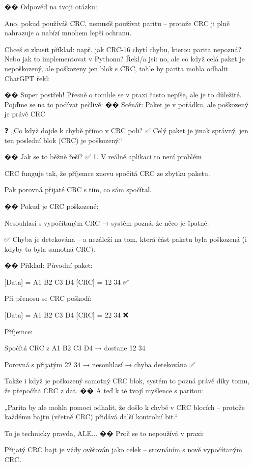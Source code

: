 �� Odpověď na tvoji otázku:

    Ano, pokud používáš CRC, nemusíš používat paritu – protože CRC ji plně nahrazuje a nabízí mnohem lepší ochranu.

Chceš si zkusit příklad: např. jak CRC-16 chytí chybu, kterou parita nepozná? Nebo jak to implementovat v Pythonu?
Řekl/a jsi:
no, ale co když celá paket je nepoškozený, ale poškozeny jen blok s CRC, tohle by parita mohla odhalit
ChatGPT řekl:

�� Super postřeh! Přesně o tomhle se v praxi často nepíše, ale je to důležité. Pojďme se na to podívat pečlivě:
�� Scénář: Paket je v pořádku, ale poškozený je právě CRC

    ❓ „Co když dojde k chybě přímo v CRC poli?
    ✅ Celý paket je jinak správný, jen ten poslední blok (CRC) je poškozený.“

�� Jak se to běžně řeší?
✅ 1. V reálné aplikaci to není problém

    CRC funguje tak, že příjemce znovu spočítá CRC ze zbytku paketu.

    Pak porovná přijaté CRC s tím, co sám spočítal.

�� Pokud je CRC poškozené:

    Nesouhlasí s vypočítaným CRC → systém pozná, že něco je špatně.

    ✅ Chyba je detekována – a nezáleží na tom, která část paketu byla poškozená (i kdyby to byla samotná CRC).

�� Příklad:
Původní paket:

[Data] = A1 B2 C3 D4
[CRC]  = 12 34  ✅

Při přenosu se CRC poškodí:

[Data] = A1 B2 C3 D4
[CRC]  = 22 34  ❌

    Příjemce:

        Spočítá CRC z A1 B2 C3 D4 → dostane 12 34

        Porovná s přijatým 22 34 → nesouhlasí → chyba detekována ✅

Takže i když je poškozený samotný CRC blok, systém to pozná právě díky tomu, že přepočítá CRC z dat.
�� A teď k té tvojí myšlence s paritou:

    „Parita by ale mohla pomoci odhalit, že došlo k chybě v CRC blocích – protože každému bajtu (včetně CRC) přidává další kontrolní bit.“

To je technicky pravda, ALE...
�� Proč se to nepoužívá v praxi:

    Přijatý CRC bajt je vždy ověřován jako celek – srovnáním s nově vypočítaným CRC.

